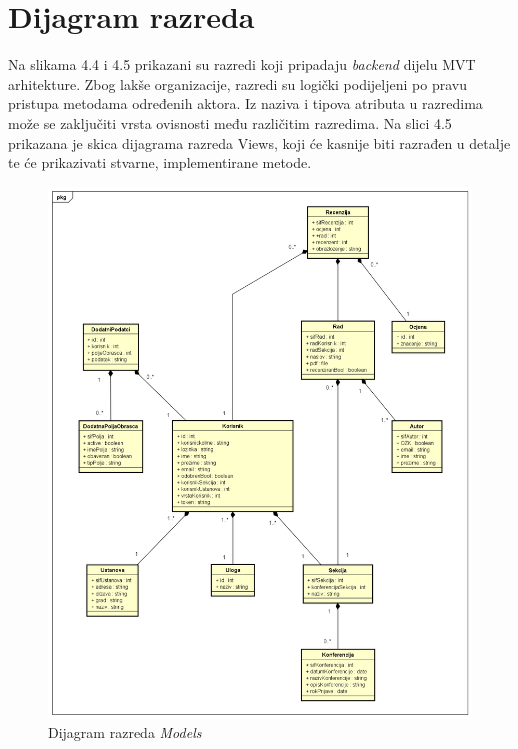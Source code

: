 			
		\section{Dijagram razreda}

		
			Na slikama 4.4 i 4.5 prikazani su razredi koji pripadaju \textit{backend} dijelu MVT arhitekture.
			\newline
			\newline
			\indent Zbog lakše organizacije, razredi su logički podijeljeni po pravu pristupa metodama određenih aktora. Iz naziva i tipova atributa u razredima može se zaključiti vrsta ovisnosti među različitim razredima.
			\newline
			\newline
			\indent Na slici 4.5 prikazana je skica dijagrama razreda Views, koji će kasnije biti razrađen u detalje te će prikazivati stvarne, implementirane metode.

				\begin{figure}[H]
					\includegraphics[width= 15 cm, keepaspectratio]{dijagrami/Modeli_UML.png} 
					\centering
					\caption{Dijagram razreda \textit{Models} }
					\label{fig:DijagramModels}
				\end{figure}

